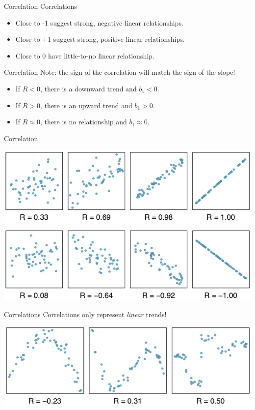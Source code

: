 \begin{frame}{Correlation}
    Correlations
    \begin{itemize}
        \item Close to -1 suggest strong, negative linear relationships.
        \item Close to +1 suggest strong, positive linear relationships.
        \item Close to 0 have little-to-no linear relationship. 
    \end{itemize}
\end{frame}

\begin{frame}{Correlation}
    Note: the sign of the correlation will match the sign of the slope!
    \begin{itemize}
        \item If $R < 0$, there is a downward trend and $b_1 < 0$.
        \item If $R > 0$, there is an upward trend and $b_1 > 0$.
        \item If $R \approx 0$, there is no relationship and $b_1 \approx 0$.
    \end{itemize}
\end{frame}

\begin{frame}{Correlation}
    \begin{center}
        \includegraphics[scale=0.35]{images/correlations.png}
    \end{center}
\end{frame}

\begin{frame}{Correlations}
    Correlations only represent \textit{linear} trends!
    \begin{center}
        \includegraphics[scale=0.4]{images/nonlincor.png}
    \end{center}
\end{frame}
